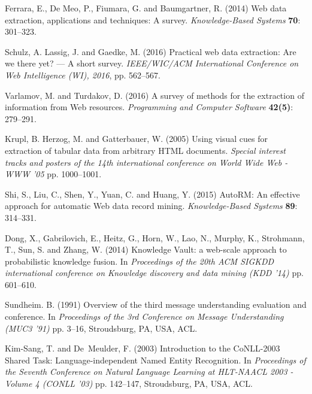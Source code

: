 \documentclass{nle}
\begin{document}
\begin{thebibliography}{}
Ferrara, E., De Meo, P., Fiumara, G. and Baumgartner, R. (2014)
Web data extraction, applications and techniques: A survey.
{\it Knowledge-Based Systems}
{\bf 70}: 301--323.

Schulz, A. Lassig, J. and Gaedke, M. (2016)
Practical web data extraction: Are we there yet? --- A short survey.
{\it IEEE/WIC/ACM International Conference on Web Intelligence (WI), 2016}, 
pp. 562--567.

Varlamov, M. and Turdakov, D. (2016)
A survey of methods for the extraction of information from Web resources.
{\it Programming and Computer Software}
{\bf 42(5)}: 279--291.

Krupl, B. Herzog, M. and Gatterbauer, W. (2005)
Using visual cues for extraction of tabular data from arbitrary HTML documents.
{\it Special interest tracks and posters of the 14th international conference on World Wide Web - WWW '05} 
pp. 1000--1001.

Shi, S., Liu, C., Shen, Y., Yuan, C. and Huang, Y. (2015)
AutoRM: An effective approach for automatic Web data record mining.
{\it Knowledge-Based Systems}
{\bf 89}: 314--331.

Dong, X., Gabrilovich, E., Heitz, G., Horn, W., Lao, N., Murphy, K., Strohmann, T., Sun, S. and Zhang, W. (2014)
Knowledge Vault: a web-scale approach to probabilistic knowledge fusion.
In {\it Proceedings of the 20th ACM SIGKDD international conference on Knowledge discovery and data mining (KDD '14)}
pp. 601--610.

Sundheim. B. (1991)
Overview of the third message understanding evaluation and conference.
In {\it Proceedings of the 3rd Conference on Message Understanding (MUC3 '91)}
pp. 3--16, Stroudsburg, PA, USA, ACL.

Kim-Sang, T. and De~Meulder, F. (2003)
Introduction to the CoNLL-2003 Shared Task: Language-independent Named Entity Recognition.
In {\it Proceedings of the Seventh Conference on Natural Language Learning at HLT-NAACL 2003 - Volume 4 (CONLL '03)}
pp. 142--147, Stroudsburg, PA, USA, ACL.


\end{thebibliography}
\end{document}
